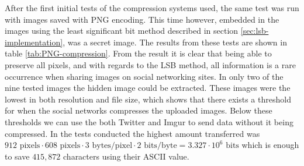 After the first initial tests of the compression systems used, the same test was run with images saved with PNG encoding.
This time however, embedded in the images using the least significant bit method described in section \ref{sec:lsb-implementation}, was a secret image. 
The results from these tests are shown in table \ref{tab:PNG-compression}.
From the result it is clear that being able to preserve all pixels, and with regards to the LSB method, all information is a rare occurrence when sharing images on social networking sites. In only two of the nine tested images the hidden image could be extracted. 
These images were the lowest in both resolution and file size, which shows that there exists a threshold for when the social networks compresses the uploaded images. 
Below these thresholds we can use the both Twitter and Imgur to send data without it being compressed. In the tests conducted the highest amount transferred was $912\text{ pixels} \cdot 608\text{ pixels} \cdot 3\text{ bytes/pixel} \cdot 2\text{ bits/byte} = 3.327\cdot 10^6\text{ bits}$ which is enough to save $415,872$ characters using their ASCII value.\\ 


